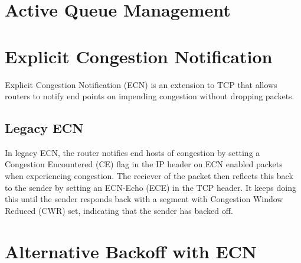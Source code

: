 \section{Active Queue Management}

\section{Explicit Congestion Notification}
Explicit Congestion Notification (ECN) is an extension to TCP that allows routers to notify end points on impending congestion
without dropping packets.

\subsection{Legacy ECN}
In legacy ECN, the router notifies end hosts of congestion by setting a Congestion Encountered (CE) flag in the IP header on ECN enabled packets
when experiencing congestion. The reciever of the packet then reflects this back to the sender by setting an ECN-Echo (ECE) in the TCP
header. It keeps doing this until the sender responds back with a segment with Congestion Window Reduced (CWR) set,
indicating that the sender has backed off.


\section{Alternative Backoff with ECN}

